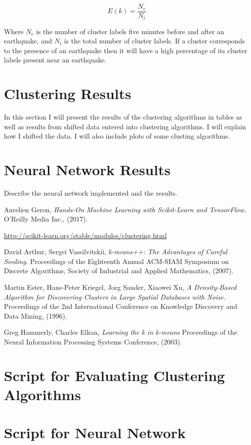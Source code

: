 \documentclass[colorlinks=true,pdfstartview=FitV,linkcolor=blue,
            citecolor=red,urlcolor=magenta]{ligodoc}
\begin{document}
\[E(k) = \frac{N_e}{N_t}\]

Where \(N_e\) is the number of cluster labels five minutes before and after an earthquake, and \(N_t\) is the total number of cluster labels. If a cluster corresponds to the presence of an earthquake then it will have a high percentage of its cluster labels present near an earthquake.  

\section{Clustering Results}

\indent

\par In this section I will present the results of the clustering algorithms in tables as well as results from shifted data entered into clustering algorithms. I will explain how I shifted the data. I will also include plots of some clusting algorithms.

\section{Neural Network Results}

\indent

\par Describe the neural network implemented and the results. 

\begin{thebibliography}{9}
      
	  Aurelien Geron,
	  \emph{Hands-On Machine Learning with Scikit-Learn and TensorFlow}.
	  O'Reilly Media Inc., (2017).    
        
          \url{http://scikit-learn.org/stable/modules/clustering.html}

          David Arthur, Sergei Vassilvitskii,
          \emph{k-means++: The Advantages of Careful Seeding}.
          Proceedings of the Eighteenth Annual ACM-SIAM Symposium on Discrete Algorithms, Society of Industrial and Applied Mathematics, (2007).

          Martin Ester, Hans-Peter Kriegel, Jorg Sander, Xiaowei Xu,
          \emph{A Density-Based Algorithm for Discovering Clusters in Large Spatial Databases with Noise}.
          Proceedings of the 2nd International Conference on Knowledge Discovery and Data Mining, (1996).

          Greg Hammerly, Charles Elkan,
          \emph{Learning the k in k-means}
          Proceedings of the Neural Information Processing Systems Conference, (2003).
          
\end{thebibliography}

\appendix
\section{Script for Evaluating Clustering Algorithms}

\section{Script for Neural Network}
\end{document}
